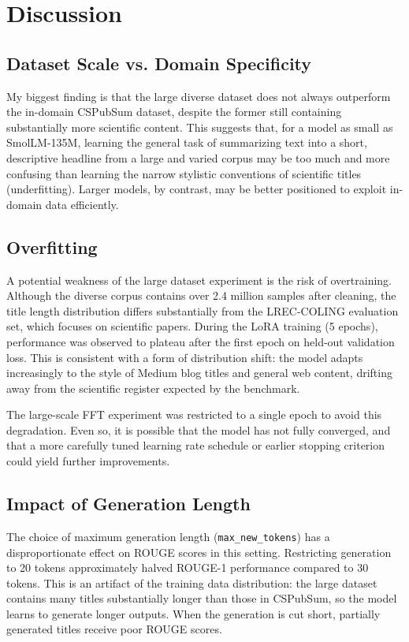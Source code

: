 \documentclass[12pt,conference]{IEEEtran}
\begin{document}
\section{Discussion}
\subsection{Dataset Scale vs. Domain Specificity}
My biggest finding is that the large diverse dataset does not always outperform the in-domain CSPubSum dataset, despite the former still containing substantially more scientific content. This suggests that, for a model as small as SmolLM-135M, learning the general task of summarizing text into a short, descriptive headline from a large and varied corpus may be too much and more confusing than learning the narrow stylistic conventions of scientific titles (underfitting). Larger models, by contrast, may be better positioned to exploit in-domain data efficiently.

\subsection{Overfitting}
A potential weakness of the large dataset experiment is the risk of overtraining. Although the diverse corpus contains over 2.4 million samples after cleaning, the title length distribution differs substantially from the LREC-COLING evaluation set, which focuses on scientific papers. During the LoRA training (5 epochs), performance was observed to plateau after the first epoch on held-out validation loss. This is consistent with a form of distribution shift: the model adapts increasingly to the style of Medium blog titles and general web content, drifting away from the scientific register expected by the benchmark.

The large-scale FFT experiment was restricted to a single epoch to avoid this degradation. Even so, it is possible that the model has not fully converged, and that a more carefully tuned learning rate schedule or earlier stopping criterion could yield further improvements.

\subsection{Impact of Generation Length}
The choice of maximum generation length (\texttt{max\_new\_tokens}) has a disproportionate effect on ROUGE scores in this setting. Restricting generation to 20 tokens approximately halved ROUGE-1 performance compared to 30 tokens. This is an artifact of the training data distribution: the large dataset contains many titles substantially longer than those in CSPubSum, so the model learns to generate longer outputs. When the generation is cut short, partially generated titles receive poor ROUGE scores.
\end{document}
